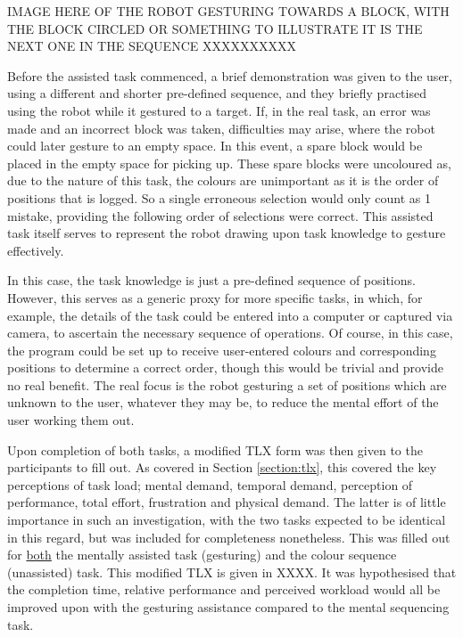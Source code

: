 \documentclass[11pt]{article}
\begin{document}
IMAGE HERE OF THE ROBOT GESTURING TOWARDS A BLOCK, WITH THE BLOCK CIRCLED OR SOMETHING TO ILLUSTRATE IT IS THE NEXT ONE IN THE SEQUENCE XXXXXXXXXX

Before the assisted task commenced, a brief demonstration was given to the user, using a different and shorter pre-defined sequence, and they briefly practised using the robot while it gestured to a target. If, in the real task, an error was made and an incorrect block was taken, difficulties may arise, where the robot could later gesture to an empty space. In this event, a spare block would be placed in the empty space for picking up. These spare blocks were uncoloured as, due to the nature of this task, the colours are unimportant as it is the order of positions that is logged. So a single erroneous selection would only count as 1 mistake, providing the following order of selections were correct. This assisted task itself serves to represent the robot drawing upon task knowledge to gesture effectively. 

In this case, the task knowledge is just a pre-defined sequence of positions. However, this serves as a generic proxy for more specific tasks, in which, for example, the details of the task could be entered into a computer or captured via camera, to ascertain the necessary sequence of operations. Of course, in this case, the program could be set up to receive user-entered colours and corresponding positions to determine a correct order, though this would be trivial and provide no real benefit. The real focus is the robot gesturing a set of positions which are unknown to the user, whatever they may be, to reduce the mental effort of the user working them out.

Upon completion of both tasks, a modified TLX form was then given to the participants to fill out. As covered in Section \ref{section:tlx}, this covered the key perceptions of task load; mental demand, temporal demand, perception of performance, total effort, frustration and physical demand. The latter is of little importance in such an investigation, with the two tasks expected to be identical in this regard, but was included for completeness nonetheless. This was filled out for \underline{both} the mentally assisted task (gesturing) and the colour sequence (unassisted) task. This modified TLX is given in XXXX. It was hypothesised that the completion time, relative performance and perceived workload would all be improved upon with the gesturing assistance compared to the mental sequencing task.
\end{document}
